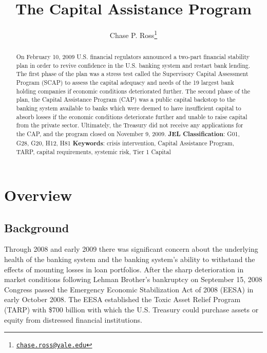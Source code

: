 \documentclass[12pt]{article}
\begin{document}
	\lhead{}
	\rhead{}
	\renewcommand{\headrulewidth}{0.0pt}
	\renewcommand{\footrulewidth}{0.0pt}

\title{The Capital Assistance Program}
\author{Chase P. Ross\thanks{\texttt{\href{mailto:chase.ross@yale.edu}{chase.ross@yale.edu}}}}
\date{}


\maketitle

\begin{abstract}
On February 10, 2009 U.S. financial regulators announced a two-part financial stability plan in order to revive confidence in the U.S. banking system and restart bank lending. The first phase of the plan was a stress test called the Supervisory Capital Assessment Program (SCAP) to assess the capital adequacy and needs of the 19 largest bank holding companies if economic conditions deteriorated further. The second phase of the plan, the Capital Assistance Program (CAP) was a public capital backstop to the banking system available to banks which were deemed to have insufficient capital to absorb losses if the economic conditions deteriorate further and unable to raise capital from the private sector. Ultimately, the Treasury did not receive any applications for the CAP, and the program closed on November 9, 2009.
\newline
\newline
\textbf{JEL Classification}: G01, G28, G20, H12, H81
\newline
\textbf{Keywords}: crisis intervention, Capital Assistance Program, TARP, capital requirements, systemic risk, Tier 1 Capital

\end{abstract}
\newpage
\tableofcontents

\newpage
\linenumbers
\section{Overview}

\subsection{Background}

Through 2008 and early 2009 there was significant concern about the underlying health of the banking system and the banking system's ability to withstand the effects of mounting losses in loan portfolios. After the sharp deterioration in market conditions following Lehman Brother's bankruptcy on September 15, 2008 Congress passed the Emergency Economic Stabilization Act of 2008 (EESA) in early October 2008. The EESA established the Toxic Asset Relief Program (TARP) with \$700 billion with which the U.S. Treasury could purchase assets or equity from distressed financial institutions.
\end{document}

